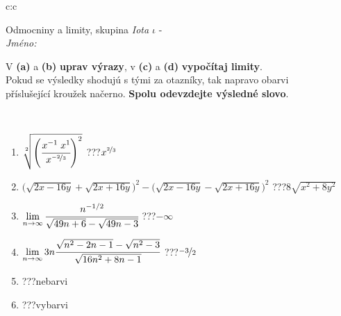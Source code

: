 \documentclass[10pt]{report}
\begin{document}
\newpage
\thispagestyle{empty}
\begin{tabular}{c:c}
\begin{minipage}[c][104.5mm][t]{0.5\linewidth}
\begin{center}
\vspace{7mm}
{\huge Odmocniny a limity, skupina \textit{Iota $\iota$} -}\\[5mm]
\textit{Jméno:}\phantom{xxxxxxxxxxxxxxxxxxxxxxxxxxxxxxxxxxxxxxxxxxxxxxxxxxxxxxxxxxxxxxxxx}\\[5mm]
\begin{minipage}{0.95\linewidth}
\begin{center}
V \textbf{(a)} a \textbf{(b)} \textbf{uprav výrazy}, v \textbf{(c)} a \textbf{(d)} \textbf{vypočítaj limity}.\\Pokud se výsledky shodujú s tými za otazníky, tak napravo obarvi\\příslušející kroužek načerno. \textbf{Spolu odevzdejte výsledné slovo}.
\end{center}
\end{minipage}
\\[1mm]
\begin{minipage}{0.79\linewidth}
\begin{center}
\begin{varwidth}{\linewidth}
\begin{enumerate}
\small
\item $\sqrt[2]{\left(\cfrac{x^{-1}\;x^{1}}{x^{\nicefrac{-2}{3}}}\right)^{2}}$\quad \dotfill\; ???\;\dotfill \quad $x^{\nicefrac{2}{3}}$
\item {\footnotesize{\scriptsize$\big(\sqrt{2x-16y}+\sqrt{2x+16y}\big)^2-\big(\sqrt{2x-16y}-\sqrt{2x+16y}\big)^2$}\quad \dotfill\; ???\;\dotfill \quad $8\sqrt{x^2+8y^2}$}
\item $\lim\limits_{n\to\infty}\cfrac{n^{-1/2}}{\sqrt{49n+6}-\sqrt{49n-3}}$\quad \dotfill\; ???\;\dotfill \quad $-\infty$
\item $\lim\limits_{n\to\infty}3n\cfrac{\sqrt{n^2-2n-1}-\sqrt{n^2-3}}{\sqrt{16n^2+8n-1}}$\quad \dotfill\; ???\;\dotfill \quad $\nicefrac{-3}{2}$
\item \quad \dotfill\; ???\;\dotfill \quad nebarvi
\item \quad \dotfill\; ???\;\dotfill \quad vybarvi
\end{enumerate}
\end{varwidth}
\end{center}
\end{minipage}
\begin{minipage}{0.20\linewidth}

\end{minipage}
\end{center}
\end{minipage}
\end{tabular}
\end{document}
